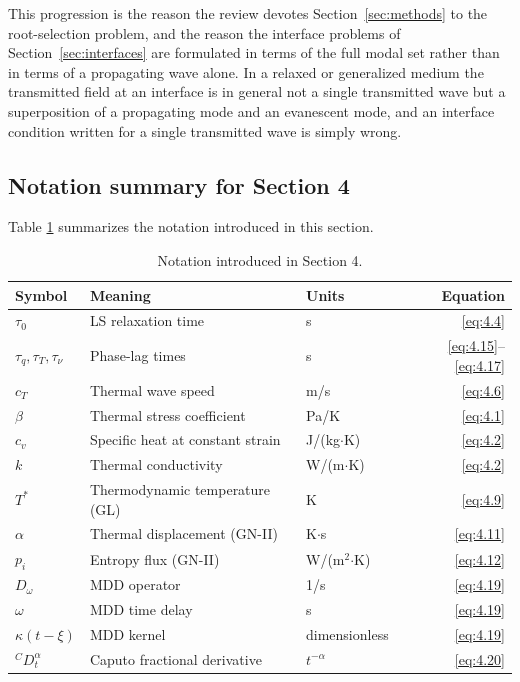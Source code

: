 This progression is the reason the review devotes Section~\ref{sec:methods} to the root-selection problem, and the reason the interface problems of Section~\ref{sec:interfaces} are formulated in terms of the full modal set rather than in terms of a propagating wave alone. In a relaxed or generalized medium the transmitted field at an interface is in general not a single transmitted wave but a superposition of a propagating mode and an evanescent mode, and an interface condition written for a single transmitted wave is simply wrong.

\subsection{Notation summary for Section 4}

Table \ref{tab:notation-sec4} summarizes the notation introduced in this section.

\begin{table}[htbp]
\centering
\small
\caption{Notation introduced in Section 4.}
\label{tab:notation-sec4}
\begin{tabularx}{\textwidth}{@{}lXlr@{}}
\toprule
\textbf{Symbol} & \textbf{Meaning} & \textbf{Units} & \textbf{Equation} \\
\midrule
$\tau_0$ & LS relaxation time & s & \eqref{eq:4.4} \\
$\tau_q, \tau_T, \tau_\nu$ & Phase-lag times & s & \eqref{eq:4.15}--\eqref{eq:4.17} \\
$c_T$ & Thermal wave speed & m/s & \eqref{eq:4.6} \\
$\beta$ & Thermal stress coefficient & Pa/K & \eqref{eq:4.1} \\
$c_v$ & Specific heat at constant strain & J/(kg$\cdot$K) & \eqref{eq:4.2} \\
$k$ & Thermal conductivity & W/(m$\cdot$K) & \eqref{eq:4.2} \\
$T^*$ & Thermodynamic temperature (GL) & K & \eqref{eq:4.9} \\
$\alpha$ & Thermal displacement (GN-II) & K$\cdot$s & \eqref{eq:4.11} \\
$p_i$ & Entropy flux (GN-II) & W/(m$^2$$\cdot$K) & \eqref{eq:4.12} \\
$D_\omega$ & MDD operator & 1/s & \eqref{eq:4.19} \\
$\omega$ & MDD time delay & s & \eqref{eq:4.19} \\
$\kappa(t-\xi)$ & MDD kernel & dimensionless & \eqref{eq:4.19} \\
${}^C D_t^\alpha$ & Caputo fractional derivative & $t^{-\alpha}$ & \eqref{eq:4.20} \\
\bottomrule
\end{tabularx}
\end{table}

